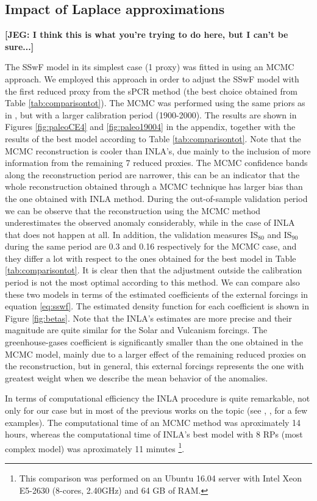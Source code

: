 \documentclass[11pt]{amsart}
\theoremstyle{plain}
\theoremstyle{definition}
\theoremstyle{remark}
\newcommand{\jeg}[1]{\color{ProcessBlue}\textbf{[JEG: #1]}\normalcolor}
\begin{document}
\subsection{Impact of Laplace approximations}

\jeg{I think this is what you're trying to do here, but I can't be sure...}

The SSwF model in its simplest case (1 proxy) was fitted in \cite{Barboza2014}
using an MCMC approach. We employed this approach in order to adjust the
SSwF model with the first reduced proxy from the sPCR method (the best choice
obtained from Table \ref{tab:comparisontot}). The MCMC was performed using the
same priors as in \cite{Barboza2014}, but with a larger calibration period
(1900-2000). The results are shown in Figures \ref{fig:paleoCE4} and
\ref{fig:paleo19004} in the appendix, together with the results of the best
model according to Table \ref{tab:comparisontot}. Note that the MCMC reconstruction is cooler than INLA's, due
mainly to the inclusion of more information from the remaining 7 reduced
proxies. The MCMC confidence bands along the reconstruction period are narrower,
this can be an indicator that the whole reconstruction obtained through a MCMC technique has larger
bias than the one obtained with INLA method. During the out-of-sample validation
period we can be observe that the reconstruction using the MCMC method
underestimates the observed anomaly considerably, while in the case of INLA that
does not happen at all. In addition, the validation measures IS$_{80}$ and IS$_{90}$
during the same period are 0.3 and 0.16 respectively for the MCMC case, and they
differ a lot with respect to the ones obtained for the best model in Table
\ref{tab:comparisontot}. It is clear then that the adjustment outside the
calibration period is not the most optimal according to this method. We can
compare also these two models in terms of the estimated coefficients of the
external forcings in equation \eqref{eq:sswf}. The estimated density function
for each coefficient is shown in Figure \ref{fig:betas}. Note that the INLA's
estimates are more precise and their magnitude are quite similar for the Solar and Vulcanism
forcings. The greenhouse-gases coefficient is significantly smaller than the one
obtained in the MCMC model, mainly due to a larger effect of the remaining
reduced proxies on the reconstruction, but in general, this external forcings
represents the one with greatest weight when we describe the mean behavior of the anomalies.

In terms of computational efficiency the INLA procedure is quite remarkable, not only
for our case but in most of the previous works on the topic (see \cite{Rue2009},
\cite{Blangiardo2013}, \cite{Ruiz-Cardenas2012} for a few examples). The
computational time of an MCMC method was
aproximately 14 hours, whereas the computational time of INLA's best model with
8 RPs (most complex model) was aproximately 11 minutes \footnote{This comparison
was performed on an Ubuntu 16.04 server with Intel Xeon E5-2630 (8-cores,
2.40GHz) and 64 GB of RAM.}. 
\end{document}
